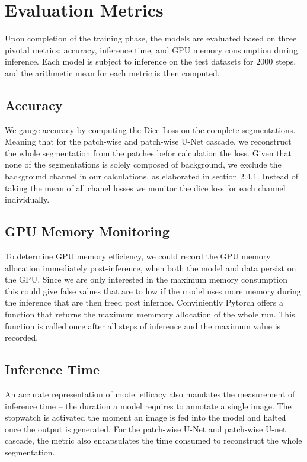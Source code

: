 \section{Evaluation Metrics}
Upon completion of the training phase, the models are evaluated based on three pivotal metrics: accuracy, inference time, and GPU memory consumption during inference.
Each model is subject to inference on the test datasets for $2000$ steps, and the arithmetic mean for each metric is then computed.

\subsection{Accuracy}
We gauge accuracy by computing the Dice Loss on the complete segmentations. Meaning that for the patch-wise and patch-wise U-Net cascade, we reconstruct the whole segmentation from the patches befor calculation the loss. Given that none of the segmentations is solely composed of background, we exclude the background channel in our calculations,
as elaborated in section 2.4.1. Instead of taking the mean of all chanel losses we monitor the dice loss for each channel individually.

\subsection{GPU Memory Monitoring}
To determine GPU memory efficiency, we could record the GPU memory allocation immediately post-inference, when both the model and data persist on the GPU.
Since we are only interested in the maximum memory consumption this could give false values that are to low if the model uses more memory during the inference that are then freed post infernce.
Conviniently Pytorch offers a function that returns the maximum memmory allocation of the whole run. This function is called once after all steps of inference and the maximum value is recorded.

\subsection{Inference Time}
An accurate representation of model efficacy also mandates the measurement of inference time – the duration a model requires to annotate a single image.
The stopwatch is activated the moment an image is fed into the model and halted once the output is generated. For the patch-wise U-Net and patch-wise U-net cascade,
the metric also encapsulates the time consumed to reconstruct the whole segmentation.

